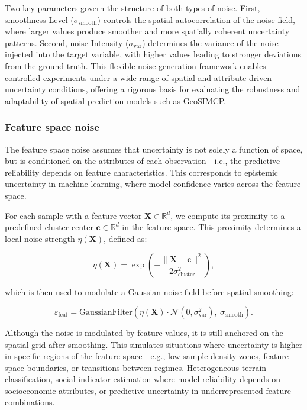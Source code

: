 \documentclass[authoryear,preprint,review,12pt]{elsarticle}
\begin{document}
Two key parameters govern the structure of both types of noise. First, smoothness Level (\(\sigma_{\text{smooth}}\)) controls the spatial autocorrelation of the noise field, where larger values produce smoother and more spatially coherent uncertainty patterns.  
Second, noise Intensity (\(\sigma_{\text{var}}\)) determines the variance of the noise injected into the target variable, with higher values leading to stronger deviations from the ground truth. This flexible noise generation framework enables controlled experiments under a wide range of spatial and attribute-driven uncertainty conditions, offering a rigorous basis for evaluating the robustness and adaptability of spatial prediction models such as GeoSIMCP.


\subsubsection{Feature space noise}

The feature space noise assumes that uncertainty is not solely a function of space, but is conditioned on the attributes of each observation—i.e., the predictive reliability depends on feature characteristics. This corresponds to epistemic uncertainty in machine learning, where model confidence varies across the feature space.

For each sample with a feature vector \(\mathbf{X} \in \mathbb{R}^d\), we compute its proximity to a predefined cluster center \(\mathbf{c} \in \mathbb{R}^d\) in the feature space. This proximity determines a local noise strength \(\eta(\mathbf{X})\), defined as:

\begin{equation}
\eta(\mathbf{X}) = \exp\left( -\frac{\|\mathbf{X} - \mathbf{c}\|^2}{2\sigma_{\text{cluster}}^2} \right),
\end{equation}

which is then used to modulate a Gaussian noise field before spatial smoothing:

\begin{equation}
\varepsilon_{\text{feat}} = \text{GaussianFilter}\left( \eta(\mathbf{X}) \cdot \mathcal{N}(0, \sigma_{\text{var}}^2),\ \sigma_{\text{smooth}} \right).
\end{equation}


Although the noise is modulated by feature values, it is still anchored on the spatial grid after smoothing. This simulates situations where uncertainty is higher in specific regions of the feature space—e.g., low-sample-density zones, feature-space boundaries, or transitions between regimes. Heterogeneous terrain classification, social indicator estimation where model reliability depends on socioeconomic attributes, or predictive uncertainty in underrepresented feature combinations.
\end{document}
